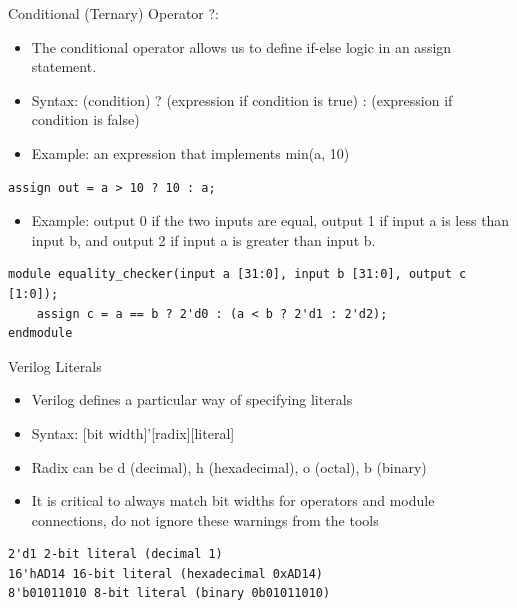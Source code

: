 \documentclass{beamer}
\begin{document}
\begin{frame}[fragile]{Conditional (Ternary) Operator ?:}
	\begin{itemize}
		\item The conditional operator allows us to define if-else logic in an assign statement.
		\item Syntax: (condition) ? (expression if condition is true) : (expression if condition is false)
		\item Example: an expression that implements min(a, 10) 
	\end{itemize}

\begin{verbatim}
assign out = a > 10 ? 10 : a;
\end{verbatim}

\begin{itemize}
	\item Example: output 0 if the two inputs are equal, output 1 if input a is less than input b, and output 2 if input a is greater than input b.
\end{itemize}
\begin{verbatim}
module equality_checker(input a [31:0], input b [31:0], output c [1:0]);
	assign c = a == b ? 2'd0 : (a < b ? 2'd1 : 2'd2);
endmodule
\end{verbatim}

\end{frame}

\begin{frame}[fragile]{Verilog Literals}
	\begin{itemize}
		\item Verilog defines a particular way of specifying literals
		\item Syntax: [bit width]'[radix][literal]
		\item Radix can be d (decimal), h (hexadecimal), o (octal), b (binary)
		\item It is critical to always match bit widths for operators and module connections, do not ignore these warnings from the tools
	\end{itemize}
\begin{verbatim}
2'd1 2-bit literal (decimal 1)
16'hAD14 16-bit literal (hexadecimal 0xAD14)
8'b01011010 8-bit literal (binary 0b01011010)
\end{verbatim}
\end{frame}
\end{document}
